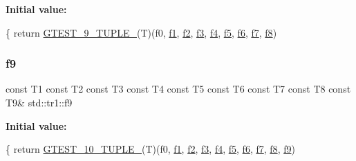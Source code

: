{\bfseries Initial value\+:}
\begin{DoxyCode}
\{
  \textcolor{keywordflow}{return} \hyperlink{gtest-tuple_8h_a1a81c17bfe3cdceb4d56b15985a44a7e}{GTEST\_9\_TUPLE\_}(T)(f0, \hyperlink{namespacestd_1_1tr1_a9c0fa65b105f8e2f58ba59ecf75fd000}{f1}, \hyperlink{namespacestd_1_1tr1_a87dd9e009868361317f587126dba63d4}{f2}, \hyperlink{namespacestd_1_1tr1_a0f7c3b47d27d42d82d1a333ea420ce4e}{f3}, \hyperlink{namespacestd_1_1tr1_adc796e02b7385d526aff708189564f67}{f4}, \hyperlink{namespacestd_1_1tr1_a9c1eb66b2b2fa321942af95405232a0d}{f5}, \hyperlink{namespacestd_1_1tr1_a6b62f32e1e3e21bceb94eb46c4cbfd56}{f6}, 
      \hyperlink{namespacestd_1_1tr1_a2185f3a1c07f2df072c39cb91ffa89a4}{f7}, \hyperlink{namespacestd_1_1tr1_ab998afa41cea8d6d26d7e4288b0bf974}{f8})
\end{DoxyCode}
\mbox{\label{namespacestd_1_1tr1_a216d2c7cdfaaf415caba2f88e2c34413}} 
\subsubsection{\texorpdfstring{f9}{f9}}
{\footnotesize\ttfamily const T1 const T2 const T3 const T4 const T5 const T6 const T7 const T8 const T9\& std\+::tr1\+::f9}

{\bfseries Initial value\+:}
\begin{DoxyCode}
\{
  \textcolor{keywordflow}{return} \hyperlink{gtest-tuple_8h_a275e7bcd84299cc44b9c1dba971951c4}{GTEST\_10\_TUPLE\_}(T)(f0, \hyperlink{namespacestd_1_1tr1_a9c0fa65b105f8e2f58ba59ecf75fd000}{f1}, \hyperlink{namespacestd_1_1tr1_a87dd9e009868361317f587126dba63d4}{f2}, \hyperlink{namespacestd_1_1tr1_a0f7c3b47d27d42d82d1a333ea420ce4e}{f3}, \hyperlink{namespacestd_1_1tr1_adc796e02b7385d526aff708189564f67}{f4}, \hyperlink{namespacestd_1_1tr1_a9c1eb66b2b2fa321942af95405232a0d}{f5}, \hyperlink{namespacestd_1_1tr1_a6b62f32e1e3e21bceb94eb46c4cbfd56}{f6}, 
      \hyperlink{namespacestd_1_1tr1_a2185f3a1c07f2df072c39cb91ffa89a4}{f7}, \hyperlink{namespacestd_1_1tr1_ab998afa41cea8d6d26d7e4288b0bf974}{f8}, \hyperlink{namespacestd_1_1tr1_a216d2c7cdfaaf415caba2f88e2c34413}{f9})
\end{DoxyCode}
